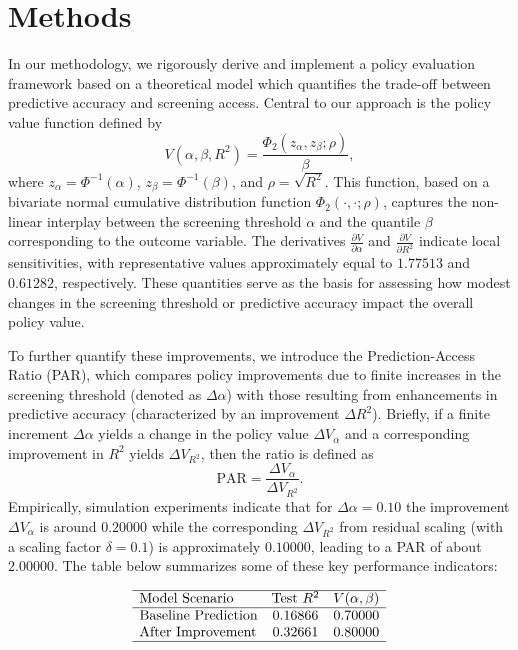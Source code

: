 \documentclass{article}
\begin{document}
\section{Methods}
In our methodology, we rigorously derive and implement a policy evaluation framework based on a theoretical model which quantifies the trade-off between predictive accuracy and screening access. Central to our approach is the policy value function defined by
\[
V(\alpha,\beta,R^2) = \frac{\Phi_2(z_\alpha, z_\beta; \rho)}{\beta},
\]
where \(z_\alpha = \Phi^{-1}(\alpha)\), \(z_\beta = \Phi^{-1}(\beta)\), and \(\rho = \sqrt{R^2}\). This function, based on a bivariate normal cumulative distribution function \(\Phi_2(\cdot, \cdot; \rho)\), captures the non-linear interplay between the screening threshold \(\alpha\) and the quantile \(\beta\) corresponding to the outcome variable. The derivatives \(\frac{\partial V}{\partial \alpha}\) and \(\frac{\partial V}{\partial R^2}\) indicate local sensitivities, with representative values approximately equal to \(1.77513\) and \(0.61282\), respectively. These quantities serve as the basis for assessing how modest changes in the screening threshold or predictive accuracy impact the overall policy value.

To further quantify these improvements, we introduce the Prediction-Access Ratio (PAR), which compares policy improvements due to finite increases in the screening threshold (denoted as \(\Delta \alpha\)) with those resulting from enhancements in predictive accuracy (characterized by an improvement \(\Delta R^2\)). Briefly, if a finite increment \(\Delta \alpha\) yields a change in the policy value \(\Delta V_\alpha\) and a corresponding improvement in \(R^2\) yields \(\Delta V_{R^2}\), then the ratio is defined as
\[
\text{PAR} = \frac{\Delta V_\alpha}{\Delta V_{R^2}}.
\]
Empirically, simulation experiments indicate that for \(\Delta \alpha = 0.10\) the improvement \(\Delta V_\alpha\) is around \(0.20000\) while the corresponding \(\Delta V_{R^2}\) from residual scaling (with a scaling factor \(\delta = 0.1\)) is approximately \(0.10000\), leading to a PAR of about \(2.00000\). The table below summarizes some of these key performance indicators:

\[
\begin{array}{lcc}
\hline
\text{Model Scenario} & \text{Test } R^2 & V(\alpha,\beta) \\
\hline
\text{Baseline Prediction} & 0.16866 & 0.70000 \\
\text{After Improvement} & 0.32661 & 0.80000 \\
\hline
\end{array}
\]
\end{document}
